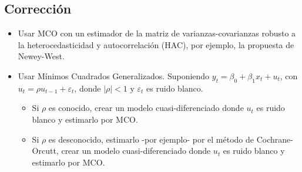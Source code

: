 \documentclass[10pt, a4paper, landscape]{extarticle}
\begin{document}
\begin{multicols}{3}
\subsection*{Corrección}

\begin{itemize}[leftmargin=*]
	\item Usar MCO con un estimador de la matriz de varianzas-covarianzas robusto a la heterocedasticidad y autocorrelación (HAC), por ejemplo, la propuesta de Newey-West.
	\item Usar Mínimos Cuadrados Generalizados. Suponiendo $y_t = \beta_0 + \beta_1 x_t + u_t$, con $u_t = \rho u_{t - 1} + \varepsilon_t$, donde $\lvert \rho \rvert < 1$ y $\varepsilon_t$ es ruido blanco.
	\begin{itemize}[leftmargin=*]
		\item Si $\rho$ es conocido, crear un modelo cuasi-diferenciado donde $u_t$ es ruido blanco y estimarlo por MCO.
		\item Si $\rho$ es desconocido, estimarlo -por ejemplo- por el método de Cochrane-Orcutt, crear un modelo cuasi-diferenciado donde $u_t$ es ruido blanco y estimarlo por MCO.
	\end{itemize}
\end{itemize}

\end{multicols}
\end{document}
